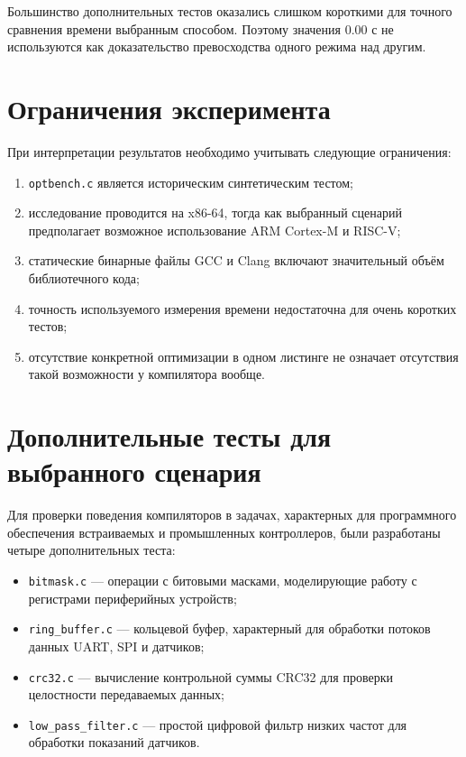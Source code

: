 \documentclass[12pt,a4paper]{article}
\begin{document}
Большинство дополнительных тестов оказались слишком короткими для точного сравнения времени выбранным способом. Поэтому значения 0.00 с не используются как доказательство превосходства одного режима над другим.

\section{Ограничения эксперимента}

При интерпретации результатов необходимо учитывать следующие ограничения:
\begin{enumerate}
    \item \texttt{optbench.c} является историческим синтетическим тестом;
    \item исследование проводится на x86-64, тогда как выбранный сценарий предполагает возможное использование ARM Cortex-M и RISC-V;
    \item статические бинарные файлы GCC и Clang включают значительный объём библиотечного кода;
    \item точность используемого измерения времени недостаточна для очень коротких тестов;
    \item отсутствие конкретной оптимизации в одном листинге не означает отсутствия такой возможности у компилятора вообще.
\end{enumerate}
\section{Дополнительные тесты для выбранного сценария}

Для проверки поведения компиляторов в задачах, характерных для программного обеспечения встраиваемых и промышленных контроллеров, были разработаны четыре дополнительных теста:

\begin{itemize}
    \item \texttt{bitmask.c} --- операции с битовыми масками, моделирующие работу с регистрами периферийных устройств;
    \item \texttt{ring\_buffer.c} --- кольцевой буфер, характерный для обработки потоков данных UART, SPI и датчиков;
    \item \texttt{crc32.c} --- вычисление контрольной суммы CRC32 для проверки целостности передаваемых данных;
    \item \texttt{low\_pass\_filter.c} --- простой цифровой фильтр низких частот для обработки показаний датчиков.
\end{itemize}
\end{document}
